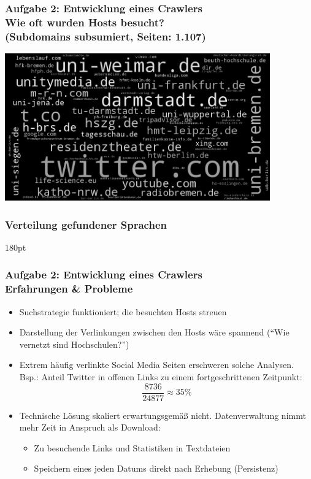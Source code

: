 \documentclass[accentcolor=tud7b,noresetcounter]{tudbeamer}
\begin{document}
  \begin{frame}[t]
  	\frametitle{Aufgabe 2: Entwicklung eines Crawlers\\
  	Wie oft wurden Hosts besucht?\\
  	(Subdomains subsumiert, Seiten: 1.107)}
  	
  	\includegraphics[width=\columnwidth, height=180pt]{../aufg02/wordcloud}	
  \end{frame}
  
  \begin{frame}
  	\frametitle{Verteilung gefundener Sprachen}
  	\resizebox {\columnwidth} {180pt} {
	}
  \end{frame}
  
  \begin{frame}
  	\frametitle{Aufgabe 2: Entwicklung eines Crawlers\\Erfahrungen \& Probleme}
  	\begin{itemize}
		\item Suchstrategie funktioniert; die besuchten Hosts streuen
		\item Darstellung der Verlinkungen zwischen den Hosts wäre spannend ("`Wie vernetzt sind Hochschulen?"')
		\item Extrem häufig verlinkte Social Media Seiten erschweren solche Analysen. Bsp.: Anteil Twitter in offenen Links zu einem fortgeschrittenen Zeitpunkt: 
			$$\frac{8736}{24877}  \approx  35\%$$
  		\item Technische Lösung skaliert erwartungsgemäß nicht. Datenverwaltung nimmt mehr Zeit in Anspruch als Download:
			\begin{itemize}
				\item Zu besuchende Links und Statistiken in Textdateien
				\item Speichern eines jeden Datums direkt nach Erhebung (Persistenz)
			\end{itemize}

  	\end{itemize}

  \end{frame}
  
\end{document}
